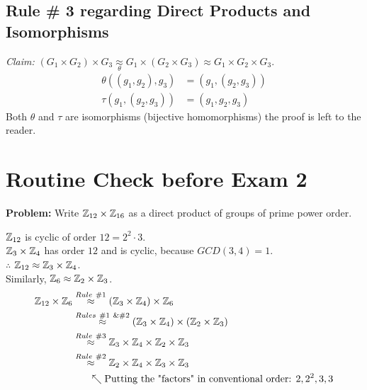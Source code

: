 \subsection*{Rule \# 3 regarding Direct Products and Isomorphisms}
\textit{Claim:}
$(G_1\times G_2)\times G_3 \underset{\theta}{\approx} G_1\times (G_2\times G_3)\approx G_1\times G_2 \times G_3$.
\begin{align}
    \theta((g_1,g_2),g_3)&=(g_1,(g_2,g_3)) \nonumber \\
    \tau(g_1,(g_2,g_3))&=(g_1,g_2,g_3) \nonumber
\end{align}
Both $\theta$ and $\tau$ are isomorphisms (bijective homomorphisms) the proof is left to the reader.

\section*{Routine Check before Exam 2}
\begin{example}
\textbf{Problem:} Write ${\mathbb{Z}}_{12}\times {\mathbb{Z}}_{16}$ as a direct product of groups of prime power order.
\steezybreak

\noindent ${\mathbb{Z}}_{12}$ is cyclic of order $12=2^2\cdot 3$.\\
${\mathbb{Z}}_3\times {\mathbb{Z}}_4$ has order $12$ and is cyclic, because $GCD(3,4)=1$.\\
$\therefore$ ${\mathbb{Z}}_{12}\approx {\mathbb{Z}}_3\times {\mathbb{Z}}_4$. \\
Similarly, ${\mathbb{Z}}_6 \approx {\mathbb{Z}}_2\times {\mathbb{Z}}_3$. \\
\begin{align}
    {\mathbb{Z}}_{12}\times {\mathbb{Z}}_6 &\overset{Rule\ \# 1}{\approx} ({\mathbb{Z}}_3\times {\mathbb{Z}}_4)\times {\mathbb{Z}}_6 \nonumber \\
    &\overset{Rules \ \# 1 \ \& \#2}{\approx} ({\mathbb{Z}}_3\times {\mathbb{Z}}_4)\times({\mathbb{Z}}_2\times {\mathbb{Z}}_3) \nonumber \\
    &\overset{Rule \ \#3}{\approx} {\mathbb{Z}}_3\times {\mathbb{Z}}_4\times{\mathbb{Z}}_2\times {\mathbb{Z}}_3 \nonumber \\
    &\overset{Rule \ \#2}{\approx} {\mathbb{Z}}_2\times {\mathbb{Z}}_4\times {\mathbb{Z}}_3\times  {\mathbb{Z}}_3 \nonumber \\
    & \ \ \ \ \ \nwarrow \text{Putting the "factors" in conventional order: } 2,2^2,3,3 \nonumber
\end{align}
\end{example}

